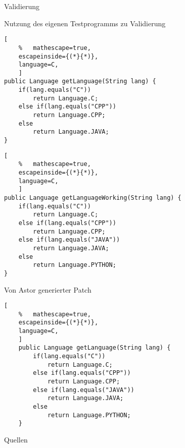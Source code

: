 %
\begin{frame}{Validierung}
\begin{itemizes}{1em}
	\item Nutzung des eigenen Testprogramms zu Validierung
\end{itemizes}
\end{frame}
%
\begin{frame}[fragile=singleslide]{}
\begin{minipage}{27em}
	\begin{lstlisting}[
	%	mathescape=true,
	escapeinside={(*}{*)}, 
	language=C,
	]
public Language getLanguage(String lang) {
	if(lang.equals("C"))
		return Language.C;
	else if(lang.equals("CPP"))
		return Language.CPP;
	else
		return Language.JAVA;
}
	\end{lstlisting}
\end{minipage}
\begin{minipage}{27em}
	\begin{lstlisting}[
	%	mathescape=true,
	escapeinside={(*}{*)}, 
	language=C,
	]
public Language getLanguageWorking(String lang) {
	if(lang.equals("C"))
		return Language.C;
	else if(lang.equals("CPP"))
		return Language.CPP;
	else if(lang.equals("JAVA"))
		return Language.JAVA;
	else
		return Language.PYTHON;
}
	\end{lstlisting}
\end{minipage}
\end{frame}
%
\begin{frame}[fragile=singleslide]{Von Astor generierter Patch}
	\begin{lstlisting}[
	%	mathescape=true,
	escapeinside={(*}{*)}, 
	language=C,
	]
	public Language getLanguage(String lang) {
		if(lang.equals("C"))
			return Language.C;
		else if(lang.equals("CPP"))
			return Language.CPP;
		else if(lang.equals("JAVA"))
			return Language.JAVA;
		else
			return Language.PYTHON;
	}
	\end{lstlisting}
\end{frame}
%
\begin{frame}{Quellen}
	
	\nocite{*}
	
\end{frame}
%